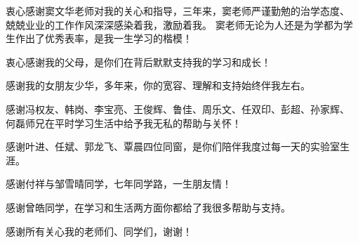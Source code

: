

\begin{ack}
  衷心感谢窦文华老师对我的关心和指导，三年来，窦老师严谨勤勉的治学态度、
  兢兢业业的工作作风深深感染着我，激励着我。
  窦老师无论为人还是为学都为学生作出了优秀表率，是我一生学习的楷模！

  衷心感谢我的父母，是你们在背后默默支持我的学习和成长！

  感谢我的女朋友少华，多年来，你的宽容、理解和支持始终伴我左右。

  感谢冯权友、韩岗、李宝亮、王俊辉、鲁佳、周乐文、任双印、彭超、孙家辉、
  何磊师兄在平时学习生活中给予我无私的帮助与关怀！

  感谢叶进、任斌、郭龙飞、覃晨四位同窗，是你们陪伴我度过每一天的实验室生涯。

  感谢付祥与邹雪晴同学，七年同学路，一生朋友情！

  感谢曾皓同学，在学习和生活两方面你都给了我很多帮助与支持。

  感谢所有关心我的老师们、同学们，谢谢！
\end{ack}
